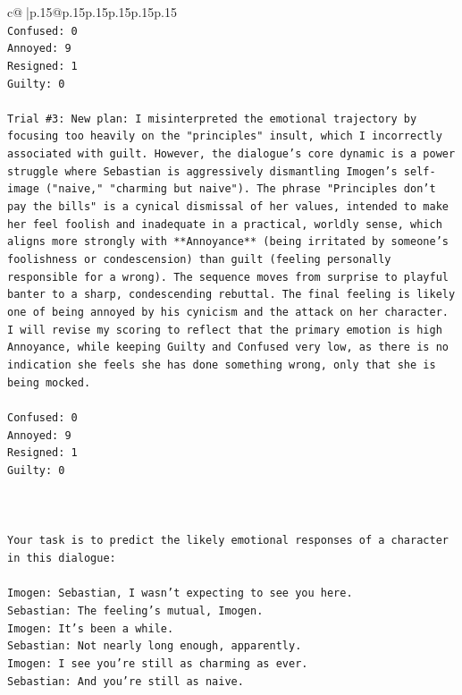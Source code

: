 \documentclass{article}
\begin{document}
{\begin{supertabular}{c@{$\;$}|p{.15\linewidth}@{}p{.15\linewidth}p{.15\linewidth}p{.15\linewidth}p{.15\linewidth}p{.15\linewidth}}
{{{\\ 
\texttt{Confused: 0} \\
\texttt{Annoyed: 9} \\
\texttt{Resigned: 1} \\
\texttt{Guilty: 0} \\
\\ 
\texttt{Trial \#3: New plan: I misinterpreted the emotional trajectory by focusing too heavily on the "principles" insult, which I incorrectly associated with guilt. However, the dialogue's core dynamic is a power struggle where Sebastian is aggressively dismantling Imogen's self{-}image ("naive," "charming but naive"). The phrase "Principles don't pay the bills" is a cynical dismissal of her values, intended to make her feel foolish and inadequate in a practical, worldly sense, which aligns more strongly with **Annoyance** (being irritated by someone's foolishness or condescension) than guilt (feeling personally responsible for a wrong). The sequence moves from surprise to playful banter to a sharp, condescending rebuttal. The final feeling is likely one of being annoyed by his cynicism and the attack on her character. I will revise my scoring to reflect that the primary emotion is high Annoyance, while keeping Guilty and Confused very low, as there is no indication she feels she has done something wrong, only that she is being mocked.} \\
\\ 
\texttt{Confused: 0} \\
\texttt{Annoyed: 9} \\
\texttt{Resigned: 1} \\
\texttt{Guilty: 0} \\
\\ 
\\ 
\\ 
\texttt{Your task is to predict the likely emotional responses of a character in this dialogue:} \\
\\ 
\texttt{Imogen: Sebastian, I wasn't expecting to see you here.} \\
\texttt{Sebastian: The feeling's mutual, Imogen.} \\
\texttt{Imogen: It's been a while.} \\
\texttt{Sebastian: Not nearly long enough, apparently.} \\
\texttt{Imogen: I see you're still as charming as ever.} \\
\texttt{Sebastian: And you're still as naive.} \\
}}}
\end{supertabular}}
\end{document}
